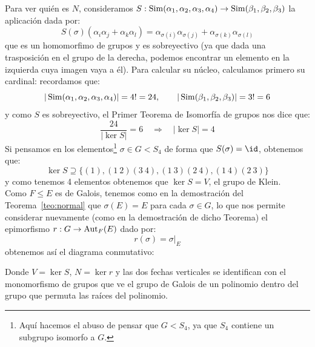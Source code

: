 \begin{ejemplo}
    \noindent
    Para ver quién es $N$, consideramos $S:\operatorname{Sim}(\alpha_1,\alpha_2,\alpha_3,\alpha_4)\to\operatorname{Sim}(\beta_1,\beta_2,\beta_3)$ la aplicación dada por:
    \begin{equation*}
        S(\sigma)(\alpha_i\alpha_j + \alpha_k\alpha_l) = \alpha_{\sigma(i)}\alpha_{\sigma(j)} + \alpha_{\sigma(k)} \alpha_{\sigma(l)} 
    \end{equation*}
    que es un homomorfimo de grupos y es sobreyectivo (ya que dada una trasposición en el grupo de la derecha, podemos encontrar un elemento en la izquierda cuya imagen vaya a él). Para calcular su núcleo, calculamos primero su cardinal: recordamos que:
    \begin{equation*}
        |\operatorname{Sim}(\alpha_1,\alpha_2,\alpha_3,\alpha_4)| = 4! = 24, \qquad |\operatorname{Sim}(\beta_1,\beta_2,\beta_3)| = 3! = 6
    \end{equation*}
    y como $S$ es sobreyectivo, el Primer Teorema de Isomorfía de grupos nos dice que:
    \begin{equation*}
        \frac{24}{|\ker S|} = 6 \quad\Longrightarrow\quad |\ker S| = 4
    \end{equation*}
    Si pensamos en los elementos\footnote{Aquí hacemos el abuso de pensar que $G<S_4$, ya que $S_4$ contiene un subgrupo isomorfo a $G$.} $\sigma\in G<S_4$ de forma que $S(\sigma) = \id$, obtenemos que:
    \begin{equation*}
        \ker S \supseteq \{(1), (1\ 2)(3\ 4), (1\ 3)(2\ 4), (1\ 4)(2\ 3)\}
    \end{equation*}
    y como tenemos 4 elementos obtenemos que $\ker S = V$, el grupo de Klein.\\

    \noindent
    Como $F\leq E$ es de Galois, tenemos como en la demostración del Teorema~\ref{teo:normal} que $\sigma(E) = E$ para cada $\sigma\in G$, lo que nos permite considerar nuevamente (como en la demostración de dicho Teorema) el epimorfismo $r:G\to \operatorname{Aut}_F(E)$ dado por:
    \begin{equation*}
        r(\sigma) = \sigma\big|_E
    \end{equation*}
    obtenemos así el diagrama conmutativo:

    \begin{figure}[H]
        \centering
    \end{figure}
    \noindent
    Donde $V=\ker S$, $N = \ker r$ y las dos fechas verticales se identifican con el monomorfismo de grupos que ve el grupo de Galois de un polinomio dentro del grupo que permuta las raíces del polinomio.\\


\end{ejemplo}
